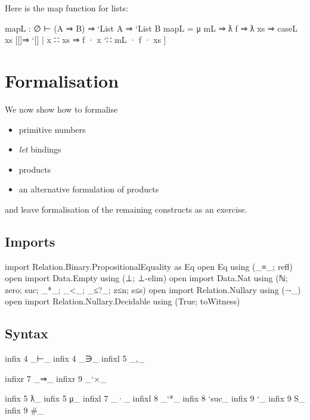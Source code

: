 Here is the map function for lists:

\begin{myDisplay}
mapL : ∅ ⊢ (A ⇒ B) ⇒ `List A ⇒ `List B
mapL = μ mL ⇒ ƛ f ⇒ ƛ xs ⇒
         caseL xs
           [[]⇒ `[]
           | x ∷ xs ⇒ f · x `∷ mL · f · xs ]
\end{myDisplay}

\hypertarget{formalisation}{%
\section{Formalisation}\label{formalisation}}

We now show how to formalise

\begin{itemize}
\tightlist
\item
  primitive numbers
\item
  \emph{let} bindings
\item
  products
\item
  an alternative formulation of products
\end{itemize}

and leave formalisation of the remaining constructs as an exercise.

\hypertarget{imports}{%
\subsection{Imports}\label{imports}}

\begin{fence}
\begin{code}
import Relation.Binary.PropositionalEquality as Eq
open Eq using (_≡_; refl)
open import Data.Empty using (⊥; ⊥-elim)
open import Data.Nat using (ℕ; zero; suc; _*_; _<_; _≤?_; z≤n; s≤s)
open import Relation.Nullary using (¬_)
open import Relation.Nullary.Decidable using (True; toWitness)
\end{code}
\end{fence}

\hypertarget{syntax-9}{%
\subsection{Syntax}\label{syntax-9}}

\begin{fence}
\begin{code}
infix  4 _⊢_
infix  4 _∋_
infixl 5 _,_

infixr 7 _⇒_
infixr 9 _`×_

infix  5 ƛ_
infix  5 μ_
infixl 7 _·_
infixl 8 _`*_
infix  8 `suc_
infix  9 `_
infix  9 S_
infix  9 #_
\end{code}
\end{fence}

